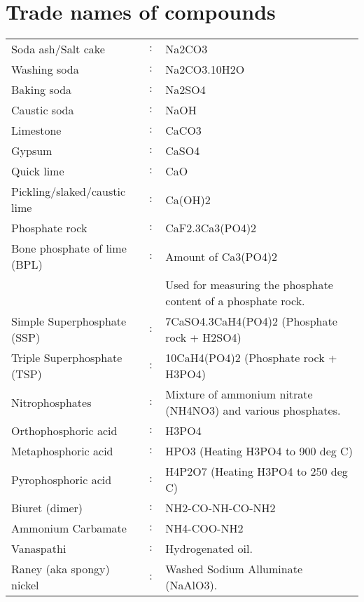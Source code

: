 \documentclass[12pt,a4paper]{article}
\begin{document}
\section{Trade names of compounds}
\begin{tabular}{@{}l@{}c@{}l@{}}
            Soda ash/Salt cake&$\colon$&Na2CO3\\
            Washing soda&$\colon$&Na2CO3.10H2O\\
            Baking soda&$\colon$&Na2SO4\\
            Caustic soda&$\colon$&NaOH\\
            Limestone&$\colon$&CaCO3\\
            Gypsum&$\colon$&CaSO4\\
            Quick lime&$\colon$&CaO\\
            Pickling/slaked/caustic lime&$\colon$&Ca(OH)2\\
            Phosphate rock&$\colon$&CaF2.3Ca3(PO4)2\\
            Bone phosphate of lime (BPL)&$\colon$&Amount of Ca3(PO4)2\\
            &&Used for measuring the phosphate content of a phosphate rock.\\
            Simple Superphosphate (SSP)&$\colon$&7CaSO4.3CaH4(PO4)2 (Phosphate rock + H2SO4)\\
            Triple Superphosphate (TSP)&$\colon$&10CaH4(PO4)2 (Phosphate rock + H3PO4)\\
            Nitrophosphates& $ \colon $ & Mixture of ammonium nitrate (NH4NO3) and various phosphates.\\
            Orthophosphoric acid& $ \colon $ & H3PO4\\
            Metaphosphoric acid& $ \colon $ & HPO3 (Heating H3PO4 to 900 deg C)\\
            Pyrophosphoric acid& $ \colon $ & H4P2O7 (Heating H3PO4 to 250 deg C)\\
            Biuret (dimer)& $ \colon $ & NH2-CO-NH-CO-NH2\\
            Ammonium Carbamate & $ \colon $ & NH4-COO-NH2\\
            Vanaspathi&$\colon$&Hydrogenated oil.\\
            Raney (aka spongy) nickel&$\colon$&Washed Sodium Alluminate (NaAlO3).
            
	\end{tabular}
\end{document}
